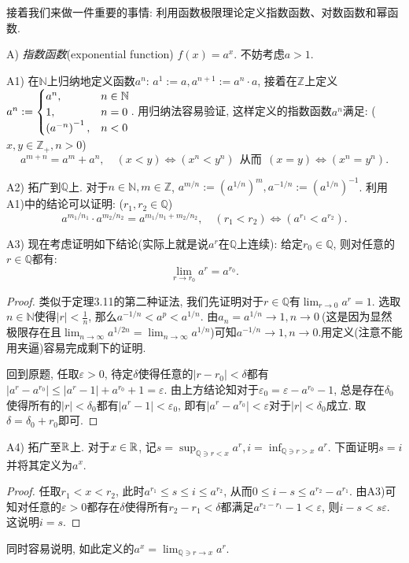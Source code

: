接着我们来做一件重要的事情: 利用函数极限理论定义指数函数、对数函数和幂函数. 

A) \textit{指数函数}(exponential function) $f(x)=a^x$. 不妨考虑$a>1$. 

A1) 在$\mathbb{N}$上归纳地定义函数$a^n$: $a^1:=a, a^{n+1}:=a^n \cdot a$, 接着在$\mathbb{Z}$上定义$a^n:=\begin{cases}
	a^n, &n\in \mathbb{N} \\ 1, &n=0 \\ \left( a^{-n} \right)^{-1}, &n<0
\end{cases}$. 用归纳法容易验证, 这样定义的指数函数$a^n$满足: ($x,y \in \mathbb{Z}_+,n>0$)$$a^{m+n}=a^m+a^n,\quad (x<y) \Leftrightarrow (x^n<y^n)  ~~\textit{从而} ~~ (x=y) \Leftrightarrow (x^n=y^n).$$

A2) 拓广到$\mathbb{Q}$上. 对于$n\in \mathbb{N},m\in \mathbb{Z}$, $a^{m/n}:= (a^{1/n})^m, a^{-1/n}:=(a^{1/n})^{-1}$. 利用A1)中的结论可以证明: ($r_1,r_2 \in \mathbb{Q}$) $$a^{m_1/n_1} \cdot a^{m_2/n_2} = a^{m_1/n_1+m_2/n_2},\quad (r_1<r_2) \Leftrightarrow (a^{r_1} < a^{r_2}).$$

A3) 现在考虑证明如下结论(实际上就是说$a^r$在$\mathbb{Q}$上连续): 给定$r_0 \in \mathbb{Q}$, 则对任意的$r \in \mathbb{Q}$都有: $$\lim_{r \to r_0} a^r = a^{r_0}.$$
\begin{proof}
	类似于定理3.11的第二种证法, 我们先证明对于$r \in \mathbb{Q}$有$\lim_{r\to 0} a^r = 1$. 选取$n \in \mathbb{N}$使得$|r|<\frac{1}{n}$, 那么$a^{-1/n} < a^p < a^{1/n}$. 由$a_n = a^{1/n} \to 1, n\to 0~$(这是因为显然极限存在且$\lim_{n\to \infty} a^{1/2n} = \lim_{n\to \infty} a^{1/n}$)可知$a^{-1/n} \to 1, n\to 0$.用定义(注意不能用夹逼)容易完成剩下的证明. 
	
	回到原题, 任取$\varepsilon >0$, 待定$\delta$使得任意的$|r-r_0|<\delta$都有$|a^r-a^{r_0}|\leq |a^r-1|+a^{r_0}+1=\varepsilon$. 由上方结论知对于$\varepsilon _0 = \varepsilon - a^{r_0} -1$, 总是存在$\delta _0$使得所有的$|r|<\delta _0$都有$|a^r-1|<\varepsilon _0$, 即有$|a^r-a^{r_0}|<\varepsilon$对于$|r|<\delta _0$成立. 取$\delta = \delta _0+r_0$即可. 
\end{proof}

A4) 拓广至$\mathbb{R}$上. 对于$x \in \mathbb{R}$, 记$\displaystyle  s=\sup_{\mathbb{Q} \ni r < x} a^r, i=\inf_{\mathbb{Q} \ni r > x} a^r$. 下面证明$s=i$并将其定义为$a^x$. 

\begin{proof}
	任取$r_1<x<r_2$, 此时$a^{r_1} \leq s \leq i \leq a^{r_2}$, 从而$0\leq i-s \leq a^{r_2}-a^{r_1}$. 由A3)可知对任意的$\varepsilon >0$都存在$\delta$使得所有$r_2-r_1<\delta$都满足$a^{r_2-r_1} - 1<\varepsilon$, 则$i-s < s\varepsilon$. 这说明$i=s$. 
\end{proof}
同时容易说明, 如此定义的$a^x = \lim_{\mathbb{Q} \ni r \to x} a^r$. 

